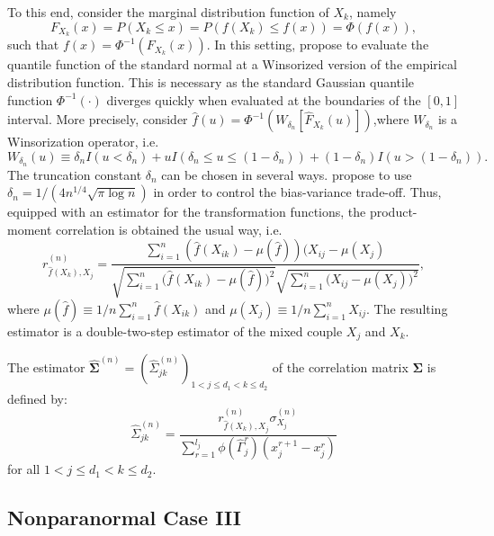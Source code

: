 To this end, consider the marginal distribution function of $X_k$, namely \[F_{X_k}(x)=P(X_k \leq x) = P(f(X_k) \leq f(x)) = \Phi(f(x)),\] such that $f(x) = \Phi^{-1}(F_{X_k}(x))$. In this setting, \citet{Liu09} propose to evaluate the quantile function of the standard normal at a Winsorized version of the empirical distribution function. This is necessary as the standard Gaussian quantile function $\Phi^{-1}(\cdot)$ diverges quickly when evaluated at the boundaries of the $[0,1]$ interval. More precisely, consider $\hat{f}(u) = \Phi^{-1}(W_{\delta_n}[\hat{F}_{X_k}(u)])$,where $W_{\delta_n}$ is a Winsorization operator, i.e. \[W_{\delta_n}(u) \equiv \delta_n I(u < \delta_n) + u I(\delta_n \leq u \leq (1-\delta_n)) + (1-\delta_n) I(u > (1-\delta_n)).\] The truncation constant $\delta_n$ can be chosen in several ways.
\citet{Liu09} propose to use $\delta_n = 1/(4n^{1/4}\sqrt{\pi\log n})$ in order to control the bias-variance trade-off. Thus, equipped with an estimator for the transformation functions, the product-moment correlation is obtained the usual way, i.e.
\begin{equation*}
    r^{(n)}_{\hat{f}(X_k),X_j} = \frac{\sum_{i=1}^n (\hat{f}(X_{ik}) - \mu(\hat{f}))(X_{ij} - \mu(X_j)}{\sqrt{\sum_{i=1}^n \Big(\hat{f}(X_{ik}) - \mu(\hat{f})\Big)^2}\sqrt{\sum_{i=1}^n \Big(X_{ij} - \mu(X_j)\Big)^2}},
\end{equation*}
where $\mu(\hat{f}) \equiv 1/n\sum_{i=1}^n \hat{f}(X_{ik})$ and $\mu(X_j) \equiv 1/n\sum_{i=1}^n X_{ij}$. The resulting estimator is a double-two-step estimator of the mixed couple $X_j$ and $X_k$.
\begin{definition}
    The estimator $\hat{\mathbf{\Sigma}}^{(n)} = (\hat{\Sigma}_{jk}^{(n)})_{1 < j \leq d_1 < k \leq d_2}$ of the correlation matrix $\mathbf{\Sigma}$ is defined by:
\begin{equation}
    \hat{\Sigma}_{jk}^{(n)} = \frac{r^{(n)}_{\hat{f}(X_k),X_j} \sigma^{(n)}_{X_j}}{\sum_{r=1}^{l_{j}} \phi(\hat{\Gamma}_j^r)(x_j^{r+1} - x_j^r)}
\end{equation}
    for all $1 < j \leq d_1 < k \leq d_2$.
\end{definition}



\subsection{Nonparanormal Case III}\label{sec::nonparanormal_case3}

